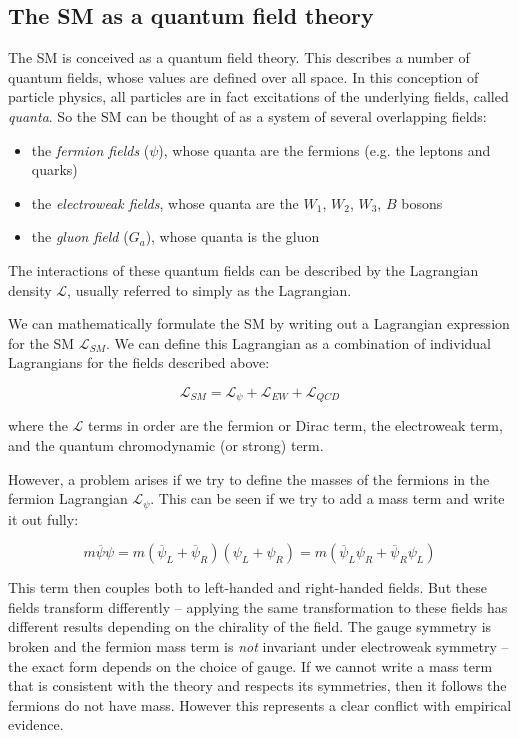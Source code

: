 \subsection{The \acrlong{SM} as a quantum field theory}
The \acrlong{SM} is conceived as a quantum field theory. This describes a number of quantum fields, whose values are defined over all space. In this conception of particle physics, all particles are in fact excitations of the underlying fields, called \textit{quanta}. So the \acrlong{SM} can be thought of as a system of several overlapping fields:

\begin{itemize}
	\item the \textit{fermion fields} ($\psi$), whose quanta are the fermions (e.g. the leptons and quarks)
	\item the \textit{electroweak fields}, whose quanta are the $W_1$, $W_2$, $W_3$, $B$ bosons 
	\item the \textit{gluon field} ($G_a$), whose quanta is the gluon
\end{itemize}

The interactions of these quantum fields can be described by the Lagrangian density $\mathcal{L}$, usually referred to simply as the Lagrangian.

We can mathematically formulate the \acrlong{SM} by writing out a Lagrangian expression for the \acrlong{SM} $\mathcal{L}_{SM}$. We can define this Lagrangian as a combination of individual Lagrangians for the fields described above:

\begin{equation}
	\mathcal{L}_{SM} = \mathcal{L}_{\psi} + \mathcal{L}_{EW} + \mathcal{L}_{QCD}
\label{eq:sm-lagrangian-1}
\end{equation}

where the $\mathcal{L}$ terms in order are the fermion or Dirac term, the electroweak term, and the quantum chromodynamic (or strong) term. 

However, a problem arises if we try to define the masses of the fermions in the fermion Lagrangian $\mathcal{L}_{\psi}$. This can be seen if we try to add a mass term and write it out fully:

\begin{equation}
	m \overline{\psi} \psi = m(\overline{\psi}_L + \overline{\psi}_R)(\psi_L + \psi_R) = m(\overline{\psi}_L \psi_R + \overline{\psi}_R \psi_L)
\label{eq:fermion-mass}
\end{equation}

This term then couples both to left-handed and right-handed fields. But these fields transform differently -- applying the same transformation to these fields has different results depending on the chirality of the field. The gauge symmetry is broken and the fermion mass term is \textit{not} invariant under electroweak symmetry -- the exact form depends on the choice of gauge. If we cannot write a mass term that is consistent with the theory and respects its symmetries, then it follows the fermions do not have mass. However this represents a clear conflict with empirical evidence. 

